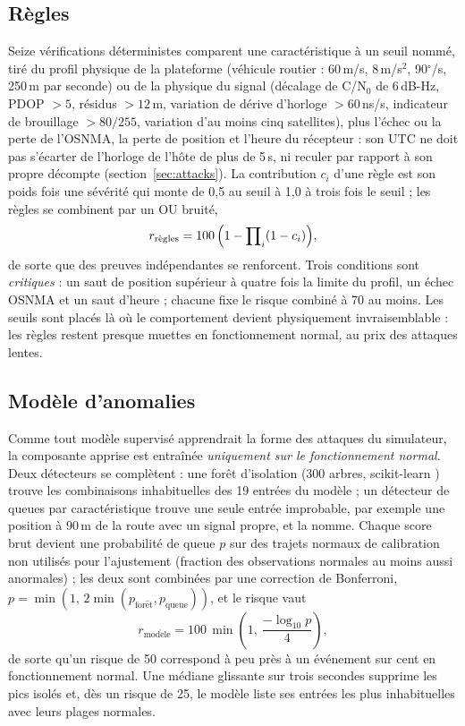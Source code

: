 \documentclass[conference]{IEEEtran}
\begin{document}
\subsection{Règles}
Seize vérifications déterministes comparent une caractéristique à un seuil nommé, tiré du profil physique de la plateforme (véhicule routier : 60\,m/s, 8\,m/s$^2$, 90$^\circ$/s, 250\,m par seconde) ou de la physique du signal (décalage de C/N$_0$ de 6\,dB-Hz, PDOP $>5$, résidus $>12$\,m, variation de dérive d'horloge $>60$\,ns/s, indicateur de brouillage $>80/255$, variation d'au moins cinq satellites), plus l'échec ou la perte de l'OSNMA, la perte de position et l'heure du récepteur : son UTC ne doit pas s'écarter de l'horloge de l'hôte de plus de 5\,s, ni reculer par rapport à son propre décompte (section~\ref{sec:attacks}). La contribution $c_i$ d'une règle est son poids fois une sévérité qui monte de 0,5 au seuil à 1,0 à trois fois le seuil ; les règles se combinent par un OU bruité,
\begin{equation}
r_{\mathrm{r\grave{e}gles}} = 100\,\Bigl(1-\prod\nolimits_i (1-c_i)\Bigr),
\label{eq:rules}
\end{equation}
de sorte que des preuves indépendantes se renforcent. Trois conditions sont \emph{critiques} : un saut de position supérieur à quatre fois la limite du profil, un échec OSNMA et un saut d'heure ; chacune fixe le risque combiné à 70 au moins. Les seuils sont placés là où le comportement devient physiquement invraisemblable : les règles restent presque muettes en fonctionnement normal, au prix des attaques lentes.

\subsection{Modèle d'anomalies}
Comme tout modèle supervisé apprendrait la forme des attaques du simulateur, la composante apprise est entraînée \emph{uniquement sur le fonctionnement normal}. Deux détecteurs se complètent : une forêt d'isolation \cite{liu2008} (300 arbres, scikit-learn \cite{sklearn}) trouve les combinaisons inhabituelles des 19 entrées du modèle ; un détecteur de queues par caractéristique trouve une seule entrée improbable, par exemple une position à 90\,m de la route avec un signal propre, et la nomme. Chaque score brut devient une probabilité de queue $p$ sur des trajets normaux de calibration non utilisés pour l'ajustement (fraction des observations normales au moins aussi anormales) ; les deux sont combinées par une correction de Bonferroni, $p=\min(1,\,2\min(p_{\mathrm{for\hat{e}t}},p_{\mathrm{queue}}))$, et le risque vaut
\begin{equation}
r_{\mathrm{mod\grave{e}le}} = 100\,\min\!\left(1,\ \frac{-\log_{10} p}{4}\right),
\label{eq:model}
\end{equation}
de sorte qu'un risque de 50 correspond à peu près à un événement sur cent en fonctionnement normal. Une médiane glissante sur trois secondes supprime les pics isolés et, dès un risque de 25, le modèle liste ses entrées les plus inhabituelles avec leurs plages normales.
\end{document}
